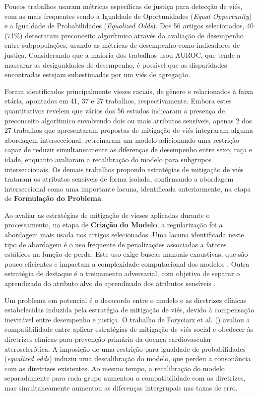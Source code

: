 Poucos trabalhos usaram métricas específicas de justiça para detecção de viés, com as mais frequentes sendo a  Igualdade de Oportunidades (\emph{Equal Opportunity}) e a Igualdade de Probabilidades (\emph{Equalized Odds}). Dos 56 artigos selecionados, 40 (71\%) detectaram preconceito algorítmico através da avaliação de desempenho entre subpopulações, usando as métricas de desempenho como indicadores de justiça. Considerando que a maioria dos trabalhos usou AUROC, que tende a mascarar as desigualdades de desempenho, é possível que as disparidades encontradas estejam subestimadas por um viés de agregação.

Foram identificados principalmente vieses raciais, de gênero e relacionados à faixa etária, apontados em 41, 37 e 27 trabalhos, respectivamente. Embora estes quantitativos revelem que vários dos 56 estudos indicaram a presença de preconceito algorítmico envolvendo dois ou mais atributos sensíveis, apenas 2 dos 27 trabalhos que apresentaram propostas de mitigação de viés integraram alguma abordagem interseccional. \citet{alday2022age} retreinaram um modelo adicionando uma restrição capaz de reduzir simultaneamente as diferenças de desempenho entre sexo, raça e idade, enquanto \citet{foryciarz2022evaluating} avaliaram a recalibração do modelo para subgrupos interseccionais. Os demais trabalhos propondo estratégias de mitigação de viés trataram os atributos sensíveis de forma isolada, confirmando a abordagem interseccional como uma importante lacuna, identificada anteriormente, na etapa de \textbf{Formulação do Problema}.

Ao avaliar as estratégias de mitigação de vieses aplicadas durante o processamento, na etapa de \textbf{Criação do Modelo}, a regularização foi a abordagem mais usada nos artigos selecionados. Uma lacuna identificada neste tipo de abordagem é o uso frequente de penalizações associadas a fatores estáticos na função de perda. Este uso exige buscas manuais exaustivas, que são pouco eficientes e impactam a complexidade computacional dos modelos \cite{alday2022age,mosteiro2022bias,pfohl2021empirical}. Outra estratégia de destaque é o treinamento adversarial, com objetivo de separar o aprendizado do atributo alvo do aprendizado dos atributos sensíveis \cite{zhao2020training,adeli2021representation}.

Um problema em potencial é o desacordo entre o modelo e as diretrizes clínicas estabelecidas induzida pela estratégia de mitigação de viés, devido à compensação inevitável entre desempenho e justiça. O trabalho de Foryciarz et al. (\citeyear{foryciarz2022evaluating}) avaliou a compatibilidade entre aplicar estratégias de mitigação de viés social e obedecer às diretrizes clínicas para prevenção primária da doença cardiovascular aterosclerótica. A imposição de uma restrição para igualdade de probabilidades (\textit{equalized odds}) induziu uma descalibração do modelo, que perdeu a consonância com as diretrizes existentes. Ao mesmo tempo, a recalibração do modelo separadamente para cada grupo aumentou a compatibilidade com as diretrizes, mas simultaneamente aumentou as diferenças intergrupais nas taxas de erro.

